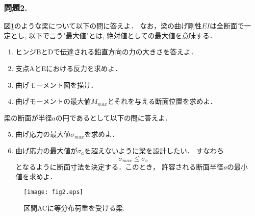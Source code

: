 \documentclass[10pt,a4j]{jarticle}
\begin{document}
\subsubsection*{問題2.}
図\ref{fig:fig2}のような梁について以下の問に答えよ．
なお，梁の曲げ剛性$EI$は全断面で一定とし, 以下で言う"最大値"とは, 
絶対値としての最大値を意味する．
\begin{enumerate}
\item
	ヒンジBとDで伝達される鉛直方向の力の大きさを答えよ．
\item
	支点AとEにおける反力を求めよ．
\item
	曲げモーメント図を描け．
\item
	曲げモーメントの最大値$M_{max}$とそれを与える断面位置を求めよ．
\end{enumerate}
梁の断面が半径$a$の円であるとして以下の問に答えよ．
\begin{enumerate}
\setcounter{enumi}{4}
\item
	曲げ応力の最大値$\sigma_{max}$を求めよ．
\item
	曲げ応力の最大値が$\sigma_a$を超えないように梁を設計したい．
	すなわち
	\[
		\sigma_{max} \leq \sigma_a
	\]
	となるように断面寸法を決定する．このとき，
	許容される断面半径$a$の最小値を求めよ．
\end{enumerate}
\begin{figure}[h]
	\begin{center}
	\texttt{[image: fig2.eps]} 
	\end{center}
	\caption{区間ACに等分布荷重を受ける梁.} 
	\label{fig:fig2}
\end{figure}
\end{document}
